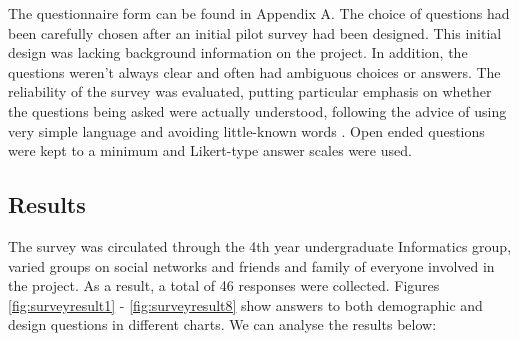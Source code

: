 The questionnaire form can be found in Appendix A. The choice of questions had been carefully chosen after an initial pilot survey had been designed. This initial design was lacking background information on the project. In addition, the questions weren't always clear and often had ambiguous choices or answers. The reliability of the survey was evaluated, putting particular emphasis on whether the questions being asked were actually understood, following the advice of using very simple language and avoiding little-known words \cite{gendall1998framework}. Open ended questions were kept to a minimum and Likert-type answer scales \cite{boone2012analyzing} were used.

\subsection{Results}
The survey was circulated through the 4th year undergraduate Informatics group, varied groups on social networks and friends and family of everyone involved in the project. As a result, a total of 46 responses were collected. Figures \ref{fig:surveyresult1} - \ref{fig:surveyresult8} show answers to both demographic and design questions in different charts. We can analyse the results below:
